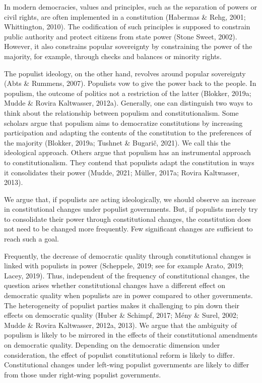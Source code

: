 \documentclass[
  abstract]{article}
\begin{document}
In modern democracies, values and principles, such as the separation of
powers or civil rights, are often implemented in a constitution
(Habermas \& Rehg, 2001; Whittington, 2010). The codification of such
principles is supposed to constrain public authority and protect
citizens from state power (Stone Sweet, 2002). However, it also
constrains popular sovereignty by constraining the power of the
majority, for example, through checks and balances or minority rights.

The populist ideology, on the other hand, revolves around popular
sovereignty (Abts \& Rummens, 2007). Populists vow to give the power
back to the people. In populism, the outcome of politics not a
restriction of the latter (Blokker, 2019a; Mudde \& Rovira Kaltwasser,
2012a). Generally, one can distinguish two ways to think about the
relationship between populism and constitutionalism. Some scholars argue
that populism aims to democratize constitutions by increasing
participation and adapting the contents of the constitution to the
preferences of the majority (Blokker, 2019a; Tushnet \& Bugarič, 2021).
We call this the ideological approach. Others argue that populism has an
instrumental approach to constitutionalism. They contend that populists
adapt the constitution in ways it consolidates their power (Mudde, 2021;
Müller, 2017a; Rovira Kaltwasser, 2013).

We argue that, if populists are acting ideologically, we should observe
an increase in constitutional changes under populist governments. But,
if populists merely try to consolidate their power through
constitutional changes, the constitution does not need to be changed
more frequently. Few significant changes are sufficient to reach such a
goal.

Frequently, the decrease of democratic quality through constitutional
changes is linked with populists in power (Scheppele, 2019; see for
example Arato, 2019; Lacey, 2019). Thus, independent of the frequency of
constitutional changes, the question arises whether constitutional
changes have a different effect on democratic quality when populists are
in power compared to other governments. The heterogeneity of populist
parties makes it challenging to pin down their effects on democratic
quality (Huber \& Schimpf, 2017; Mény \& Surel, 2002; Mudde \& Rovira
Kaltwasser, 2012a, 2013). We argue that the ambiguity of populism is
likely to be mirrored in the effects of their constitutional amendments
on democratic quality. Depending on the democratic dimension under
consideration, the effect of populist constitutional reform is likely to
differ. Constitutional changes under left-wing populist governments are
likely to differ from those under right-wing populist governments.
\end{document}
